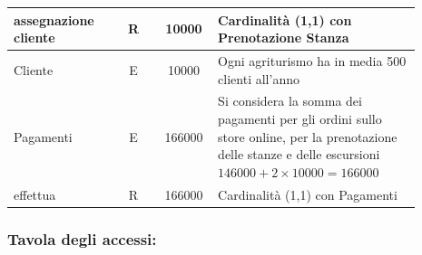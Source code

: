 \documentclass[12pt,a4paper]{article}
\begin{document}
\begin{center}
\begin{longtable}{|p{0.23\linewidth}|p{0.1\linewidth}|p{0.11\linewidth}|p{0.45\linewidth}|}
\hline
assegnazione cliente
 & 
\multicolumn{1}{|c|}{R}
 & 
\multicolumn{1}{|c|}{10000}
 & 
Cardinalità (1,1) con Prenotazione Stanza
\\

\hline
Cliente
 & 
\multicolumn{1}{|c|}{E}
 & 
\multicolumn{1}{|c|}{10000}
 & 
Ogni agriturismo ha in media 500 clienti all'anno
\\

\hline

Pagamenti
 & 
\multicolumn{1}{|c|}{E}
 & 
\multicolumn{1}{|c|}{166000}
 & 
Si considera la somma dei pagamenti per gli ordini sullo store online, per la prenotazione delle stanze e delle escursioni $146000+2\times 10000= 166000$
\\

\hline
effettua
 & 
\multicolumn{1}{|c|}{R}
 & 
\multicolumn{1}{|c|}{166000}
 & 
Cardinalità (1,1) con Pagamenti
\\

\hline

\end{longtable}\end{center}
\subsubsection*{Tavola degli accessi:}
\end{document}
